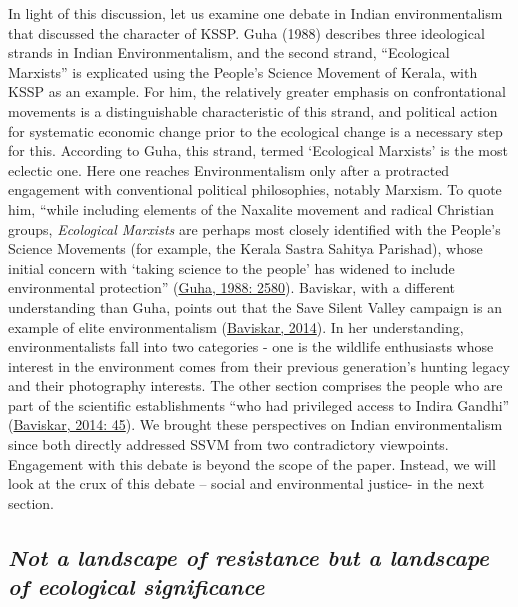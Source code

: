\documentclass[twoside, 13pt]{article}
\begin{document}
{{{{In light of this discussion, let us examine one debate in Indian environmentalism that discussed the character of KSSP. Guha (1988) describes three ideological strands in Indian Environmentalism, and the second strand, “Ecological Marxists” is explicated using the People’s Science Movement of Kerala, with KSSP as an example. For him, the relatively greater emphasis on confrontational movements is a distinguishable characteristic of this strand, and political action for systematic economic change prior to the ecological change is a necessary step for this. According to Guha, this strand, termed ‘Ecological Marxists’ is the most eclectic one. Here one reaches Environmentalism only after a protracted engagement with conventional political philosophies, notably Marxism. To quote him, “while including elements of the Naxalite movement and radical Christian groups, \textit{Ecological Marxists} are perhaps most closely identified with the People’s Science Movements (for example, the Kerala Sastra Sahitya Parishad), whose initial concern with ‘taking science to the people’ has widened to include environmental protection” (\underline{Guha, 1988: 2580}). Baviskar, with a different understanding than Guha, points out that the Save Silent Valley campaign is an example of elite environmentalism (\underline{Baviskar, 2014}). In her understanding, environmentalists fall into two categories - one is the wildlife enthusiasts whose interest in the environment comes from their previous generation’s hunting legacy and their photography interests. The other section comprises the people who are part of the scientific establishments “who had privileged access to Indira Gandhi” (\underline{Baviskar, 2014: 45}). We brought these perspectives on Indian environmentalism since both directly addressed SSVM from two contradictory viewpoints. Engagement with this debate is beyond the scope of the paper. Instead, we will look at the crux of this debate – social and environmental justice- in the next section.}


\vspace{-.2cm}

{\fontsize{8}{10}\selectfont\subsection*{\textit{Not a landscape of resistance but a landscape of ecological significance}}}


}}}
\end{document}
